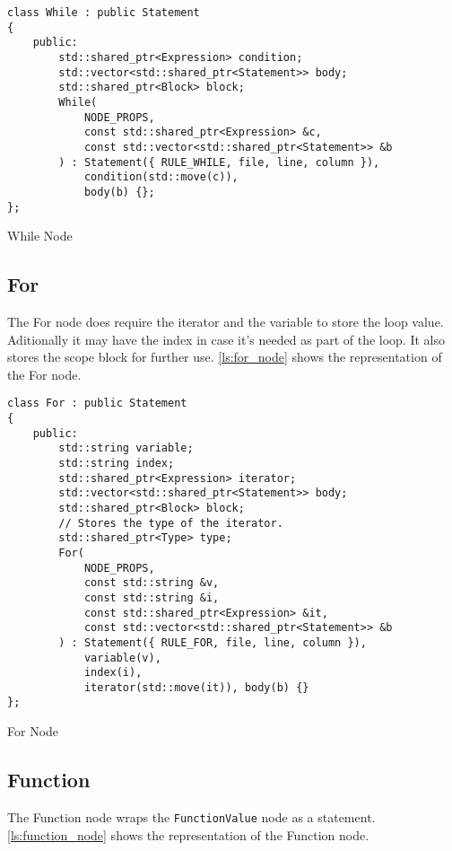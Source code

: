 \begin{listing}[H]
\begin{verbatim}
class While : public Statement
{
    public:
        std::shared_ptr<Expression> condition;
        std::vector<std::shared_ptr<Statement>> body;
        std::shared_ptr<Block> block;
        While(
            NODE_PROPS,
            const std::shared_ptr<Expression> &c,
            const std::vector<std::shared_ptr<Statement>> &b
        ) : Statement({ RULE_WHILE, file, line, column }),
            condition(std::move(c)),
            body(b) {};
};
\end{verbatim}
\caption{While Node}
\label{ls:while_node}
\end{listing}

\subsection{For}

The For node does require the iterator and the variable to store the loop value.
Aditionally it may have the index in case it's needed as part of the loop.
It also stores the scope block for further use.
\autoref{ls:for_node} shows the representation of the For node.

\begin{listing}[H]
\begin{verbatim}
class For : public Statement
{
    public:
        std::string variable;
        std::string index;
        std::shared_ptr<Expression> iterator;
        std::vector<std::shared_ptr<Statement>> body;
        std::shared_ptr<Block> block;
        // Stores the type of the iterator.
        std::shared_ptr<Type> type;
        For(
            NODE_PROPS,
            const std::string &v,
            const std::string &i,
            const std::shared_ptr<Expression> &it,
            const std::vector<std::shared_ptr<Statement>> &b
        ) : Statement({ RULE_FOR, file, line, column }),
            variable(v),
            index(i),
            iterator(std::move(it)), body(b) {}
};
\end{verbatim}
\caption{For Node}
\label{ls:for_node}
\end{listing}

\subsection{Function}

The Function node wraps the \texttt{FunctionValue} node as a statement.
\autoref{ls:function_node} shows the representation of the Function node.

